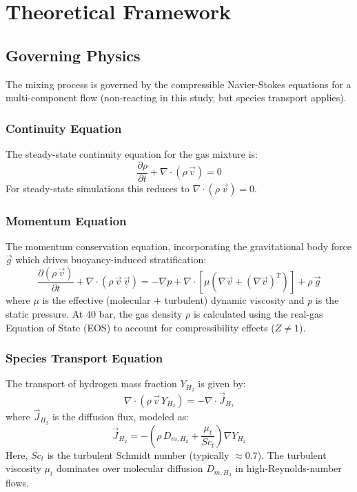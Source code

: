 \documentclass[12pt, a4paper]{report}
\begin{document}
\chapter{Theoretical Framework}

\section{Governing Physics}
The mixing process is governed by the compressible Navier-Stokes equations for a multi-component flow (non-reacting in this study, but species transport applies).

\subsection{Continuity Equation}
The steady-state continuity equation for the gas mixture is:
\begin{equation}
    \frac{\partial \rho}{\partial t} + \nabla \cdot (\rho \, \vec{v}) = 0
\end{equation}
For steady-state simulations this reduces to $\nabla \cdot (\rho \, \vec{v}) = 0$.

\subsection{Momentum Equation}
The momentum conservation equation, incorporating the gravitational body force $\vec{g}$ which drives buoyancy-induced stratification:
\begin{equation}
    \frac{\partial (\rho \, \vec{v})}{\partial t} + \nabla \cdot (\rho \, \vec{v} \, \vec{v}) = -\nabla p + \nabla \cdot \left[ \mu \left( \nabla \vec{v} + (\nabla \vec{v})^T \right) \right] + \rho \, \vec{g}
\end{equation}
where $\mu$ is the effective (molecular $+$ turbulent) dynamic viscosity and $p$ is the static pressure. At 40 bar, the gas density $\rho$ is calculated using the real-gas Equation of State (EOS) to account for compressibility effects ($Z \neq 1$).

\subsection{Species Transport Equation}
The transport of hydrogen mass fraction $Y_{H_2}$ is given by:
\begin{equation}
    \nabla \cdot (\rho \, \vec{v} \, Y_{H_2}) = -\nabla \cdot \vec{J}_{H_2}
\end{equation}
where $\vec{J}_{H_2}$ is the diffusion flux, modeled as:
\begin{equation}
    \vec{J}_{H_2} = -\left( \rho \, D_{m,H_2} + \frac{\mu_t}{Sc_t} \right) \nabla Y_{H_2}
\end{equation}
Here, $Sc_t$ is the turbulent Schmidt number (typically $\approx 0.7$). The turbulent viscosity $\mu_t$ dominates over molecular diffusion $D_{m,H_2}$ in high-Reynolds-number flows.
\end{document}
